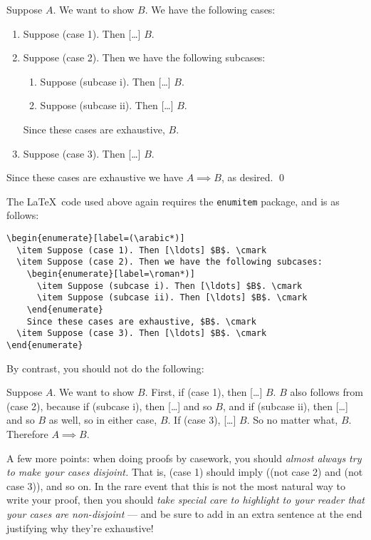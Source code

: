 \documentclass{fkpset}
\begin{document}
\begin{enumerate}[label=(\arabic*)]
  \begin{leftbar}
    Suppose $A$. We want to show $B$. We have the following cases:
    \begin{enumerate}[label=(\arabic*)]
    \item Suppose (case 1). Then [\ldots] $B$. \cmark
    \item Suppose (case 2). Then we have the following subcases:
      \begin{enumerate}[label=\roman*)]
      \item Suppose (subcase i). Then [\ldots] $B$. \cmark
      \item Suppose (subcase ii). Then [\ldots] $B$. \cmark
      \end{enumerate}
      Since these cases are exhaustive, $B$. \cmark
    \item Suppose (case 3). Then [\ldots] $B$. \cmark
    \end{enumerate}
    Since these cases are exhaustive we have $A \implies B$, as desired.
    \qed
  \end{leftbar}
  The \LaTeX\ code used above again requires the \texttt{enumitem} package,
  and is as follows:
  \begin{lstlisting}
\begin{enumerate}[label=(\arabic*)]
  \item Suppose (case 1). Then [\ldots] $B$. \cmark
  \item Suppose (case 2). Then we have the following subcases:
    \begin{enumerate}[label=\roman*)]
      \item Suppose (subcase i). Then [\ldots] $B$. \cmark
      \item Suppose (subcase ii). Then [\ldots] $B$. \cmark
    \end{enumerate}
    Since these cases are exhaustive, $B$. \cmark
  \item Suppose (case 3). Then [\ldots] $B$. \cmark
\end{enumerate}\end{lstlisting}
  By contrast, you should not do the following:
  \begin{leftbar}
    Suppose $A$. We want to show $B$. First, if (case 1), then [\ldots] $B$. $B$
    also follows from (case 2), because if (subcase i), then [\ldots] and so
    $B$, and if (subcase ii), then [\ldots] and so $B$ as well, so in either
    case, $B$. If (case 3), [\ldots] $B$. So no matter what, $B$. Therefore $A
    \implies B$.
  \end{leftbar}
  A few more points: when doing proofs by casework, you should
  \emph{almost always try to make your cases disjoint.} That is, (case 1)
  should imply ((not case 2) and (not case 3)), and so on. In the rare event
  that this is not the most natural way to write your proof, then you
  should \emph{take special care to highlight to your reader that your cases are
    non-disjoint} --- and be sure to add in an extra sentence at the end
  justifying why they're exhaustive!


\end{enumerate}
\end{document}
